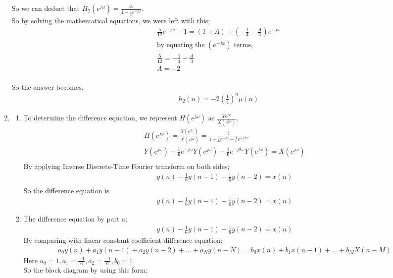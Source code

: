 \documentclass[10pt,a4paper, margin=1in]{article}
\begin{document}
\begin{enumerate}
So we can deduct that $H_{2}(e^{j\omega}) = \frac{A}{1 - \frac{1}{4}e^{-j\omega}}$. \\
So by solving the mathematical equations, we were left with this;
\begin{align*}
    \frac{5}{12} e^{-j\omega} - 1 = (1 + A) + (- \frac{1}{4} - \frac{A}{3}) e^{-j\omega} \\
    \text{by equating the $(e^{-j\omega})$ terms,} \\
    \frac{5}{12} = -\frac{1}{4} - \frac{A}{3} \\
    A = -2 \\
\end{align*}

So the answer becomes,
\begin{align*}
    h_{2}(n) = -2 (\frac{1}{4})^n \mu(n)
\end{align*}

\item %
    \begin{enumerate}
    \item %
    To determine the difference equation, we represent $H(e^{j\omega})$ as $\frac{Ye^{j\omega}}{X(e^{j\omega})}$.
    \begin{align*}
        H(e^{j\omega}) = \frac{Y(e^{j\omega})}{X(e^{j\omega})} = \frac{1}{1 - \frac{1}{6}e^{-j\omega} - \frac{1}{6}e^{-j2\omega}}\\
        Y(e^{j\omega}) - \frac{1}{6}e^{-j\omega}Y(e^{j\omega}) - \frac{1}{6}e^{-j2\omega}Y(e^{j\omega}) = X(e^{j\omega})\\
    \end{align*}
By applying Inverse Discrete-Time Fourier transform on both sides;
    \begin{align*}
        y(n) - \frac{1}{6}y(n-1) - \frac{1}{6}y(n-2) = x(n)\\
    \end{align*}
So the difference equation is
    \begin{align*}
        y(n) - \frac{1}{6}y(n-1) - \frac{1}{6}y(n-2) = x(n)
    \end{align*}
    
    
    \item %
    The difference equation by part a;\\
    \begin{align*}
        y(n) - \frac{1}{6}y(n-1) - \frac{1}{6}y(n-2) = x(n)
    \end{align*}
    By comparing with linear constant coefficient difference equation;
    \begin{align*}
        a_0 y(n) + a_1 y(n-1) + a_2 y(n-2)+...+a_N y(n-N) = b_0 x(n) + b_1 x(n-1)+...+b_M X(n-M)
    \end{align*}
    Here \(a_0 = 1, a_1 = \frac{-1}{6}, a_2 = \frac{-1}{6}, b_0 = 1\)\\
    So the block diagram by using this form;
    \\
\begin{center}
    

\end{center}
\end{enumerate}
\end{enumerate}
\end{document}
